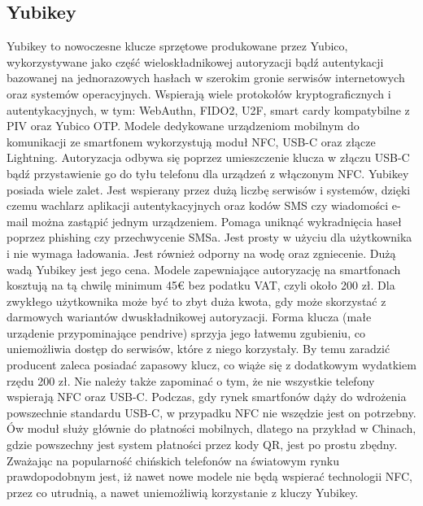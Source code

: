 \subsection{Yubikey}
Yubikey to nowoczesne klucze sprzętowe produkowane przez Yubico, wykorzystywane jako część wieloskładnikowej autoryzacji bądź autentykacji
bazowanej na jednorazowych hasłach w szerokim gronie serwisów internetowych oraz systemów operacyjnych. Wspierają wiele protokołów kryptograficznych
i autentykacyjnych, w tym: WebAuthn, FIDO2, U2F, smart cardy kompatybilne z PIV oraz Yubico OTP. Modele dedykowane urządzeniom mobilnym
do komunikacji ze smartfonem wykorzystują moduł NFC, USB-C oraz złącze Lightning. Autoryzacja odbywa się poprzez umieszczenie klucza w złączu USB-C
bądź przystawienie go do tyłu telefonu dla urządzeń z włączonym NFC\cite{Yubikey}.
\newline\newline
\indent Yubikey posiada wiele zalet. Jest wspierany przez dużą liczbę serwisów i systemów, dzięki czemu wachlarz aplikacji autentykacyjnych oraz kodów SMS
czy wiadomości e-mail można zastąpić jednym urządzeniem. Pomaga uniknąć wykradnięcia haseł poprzez phishing czy przechwycenie SMSa. Jest prosty w
użyciu dla użytkownika i nie wymaga ładowania. Jest również odporny na wodę oraz zgniecenie.
\newline\newline
\indent Dużą wadą Yubikey jest jego cena. Modele zapewniające autoryzację na smartfonach kosztują na tą chwilę minimum 45€ bez podatku VAT\cite{Yubi-Price}, czyli około 200 zł.
Dla zwykłego użytkownika może być to zbyt duża kwota, gdy może skorzystać z darmowych wariantów dwuskładnikowej autoryzacji. Forma klucza
(małe urządenie przypominające pendrive) sprzyja jego łatwemu zgubieniu, co uniemożliwia dostęp do serwisów, które z niego korzystały. By temu
zaradzić producent zaleca posiadać zapasowy klucz, co wiąże się z dodatkowym wydatkiem rzędu 200 zł. Nie należy także zapominać o tym, że nie wszystkie
telefony wspierają NFC oraz USB-C. Podczas, gdy rynek smartfonów dąży do wdrożenia powszechnie standardu USB-C, w przypadku NFC nie wszędzie jest on
potrzebny. Ów moduł służy głównie do płatności mobilnych, dlatego na przykład w Chinach, gdzie powszechny jest system płatności przez kody QR\cite{Mobile-Payments-China}, jest po prostu zbędny. Zważając na popularność chińskich telefonów na światowym rynku prawdopodobnym jest, iż nawet nowe modele nie będą wspierać technologii NFC, przez co utrudnią, a nawet uniemożliwią korzystanie z kluczy Yubikey.
\newline\newline
